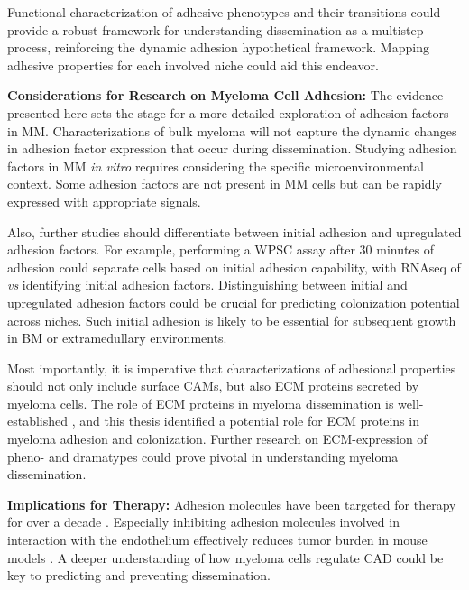 Functional characterization of adhesive phenotypes  and their transitions could provide a robust framework for
understanding dissemination as a multistep process, reinforcing the dynamic
adhesion hypothetical framework. Mapping adhesive properties for each involved
niche could aid this endeavor.




\textbf{Considerations for Research on Myeloma Cell Adhesion:}
The evidence presented here sets the stage for a more detailed exploration of
adhesion factors in MM. Characterizations of bulk myeloma will not capture
the dynamic changes in adhesion factor expression that occur during dissemination.
Studying adhesion factors in MM \textit{in vitro} requires considering the
specific microenvironmental context. Some adhesion factors are not present in MM
cells but can be rapidly expressed with appropriate signals.

Also, further studies should differentiate between initial adhesion and
upregulated adhesion factors. For example, performing a \ac{WPSC} assay after 30
minutes of adhesion could separate \INA cells based on initial adhesion
capability, with RNAseq of \nMAina \textit{vs} \MAina identifying initial
adhesion factors. Distinguishing between initial and upregulated adhesion
factors could be crucial for predicting colonization potential across niches.
Such initial adhesion is likely to be essential for subsequent growth in \ac{BM}
or extramedullary environments.

Most importantly, it is imperative that characterizations of adhesional
properties should not only include surface \acp{CAM}, but also \ac{ECM} proteins
secreted by myeloma cells. The role of \ac{ECM} proteins in myeloma
dissemination is well-established \cite{ibraheemBMMSCsderivedECMModifies2019},
and this thesis identified a potential role for \ac{ECM} proteins in myeloma
adhesion and colonization. Further research on \ac{ECM}-expression of pheno- and
dramatypes could prove pivotal in understanding myeloma dissemination.


\textbf{Implications for Therapy:}
Adhesion molecules have been targeted for therapy for over a decade
\cite{nairChapterSixEmerging2012, neriTargetingAdhesionMolecules2012}.
Especially inhibiting adhesion molecules involved in interaction with the
endothelium effectively reduces tumor burden in mouse models
\cite{asosinghUniquePathwayHoming2001a,
      mrozikTherapeuticTargetingNcadherin2015}. A deeper understanding of how myeloma
cells regulate \ac{CAD} could be key to predicting and preventing dissemination.

